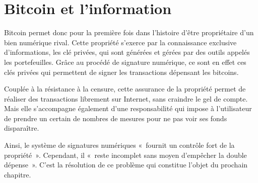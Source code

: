 \section*{Bitcoin et l'information}

Bitcoin permet donc pour la première fois dans l'histoire d'être propriétaire d'un bien numérique rival. Cette propriété s'exerce par la connaissance exclusive d'informations, les clé privées, qui sont générées et gérées par des outils appelés les portefeuilles. Grâce au procédé de signature numérique, ce sont en effet ces clés privées qui permettent de signer les transactions dépensant les bitcoins.

Couplée à la résistance à la censure, cette assurance de la propriété permet de réaliser des transactions librement sur Internet, sans craindre le gel de compte. Mais elle s'accompagne également d'une responsabilité qui impose à l'utilisateur de prendre un certain de nombres de mesures pour ne pas voir ses fonds disparaître.

Ainsi, le système de signatures numériques «~fournit un contrôle fort de la propriété~». Cependant, il «~reste incomplet sans moyen d'empêcher la double dépense~». C'est la résolution de ce problème qui constitue l'objet du prochain chapitre.